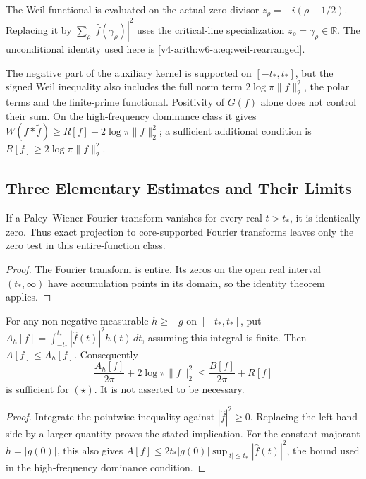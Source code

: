 \begin{remark}
\label{v4-arith:w6-a:rem:zero-sum-consequence}
The Weil functional is evaluated on the actual zero divisor
\(z_\rho=-i(\rho-1/2)\). Replacing it by
\(\sum_\rho|\widehat f(\gamma_\rho)|^2\) uses the critical-line
specialization \(z_\rho=\gamma_\rho\in\mathbb R\). The unconditional
identity used here is \eqref{v4-arith:w6-a:eq:weil-rearranged}.
\end{remark}

\begin{remark}
\label{v4-arith:w6-a:rem:bounded-residual}
The negative part of the auxiliary kernel is supported on
\([-t_*,t_*]\), but the signed Weil inequality also includes the
full norm term \(2\log\pi\|f\|_2^2\), the polar terms and the
finite-prime functional. Positivity of \(G(f)\) alone does not
control their sum. On the high-frequency dominance class it gives
\(W(f*\widetilde f)\geq R[f]-2\log\pi\|f\|_2^2\); a sufficient
additional condition is \(R[f]\geq2\log\pi\|f\|_2^2\).
\end{remark}

\subsection{Three Elementary Estimates and Their Limits}
\label{v4-arith:w6-a:bounded-interval:ruled-out}

\begin{proposition}
\label{v4-arith:w6-a:prop:rule-out-projection}
If a Paley--Wiener Fourier transform vanishes for every real
\(t>t_*\), it is identically zero. Thus exact projection to
core-supported Fourier transforms leaves only the zero test in
this entire-function class.
\end{proposition}
\begin{proof}
The Fourier transform is entire. Its zeros on the open real interval
\((t_*,\infty)\) have accumulation points in its domain, so the
identity theorem applies.
\end{proof}

\begin{proposition}
\label{v4-arith:w6-a:prop:rule-out-majorant}
For any non-negative measurable \(h\geq-g\) on \([-t_*,t_*]\),
put \(A_h[f]=\int_{-t_*}^{t_*}|\widehat f(t)|^2h(t)\,dt\), assuming
this integral is finite. Then \(A[f]\leq A_h[f]\). Consequently
\[
\frac{A_h[f]}{2\pi}+2\log\pi\|f\|_2^2
 \leq\frac{B[f]}{2\pi}+R[f]
\]
is sufficient for \((\star)\). It is not asserted to be necessary.
\end{proposition}
\begin{proof}
Integrate the pointwise inequality against \(|\widehat f|^2\geq0\).
Replacing the left-hand side by a larger quantity proves the stated
implication. For the constant majorant \(h=|g(0)|\), this also gives
\(A[f]\leq2t_*|g(0)|\sup_{|t|\leq t_*}|\widehat f(t)|^2\),
the bound used in the high-frequency dominance condition.
\end{proof}

